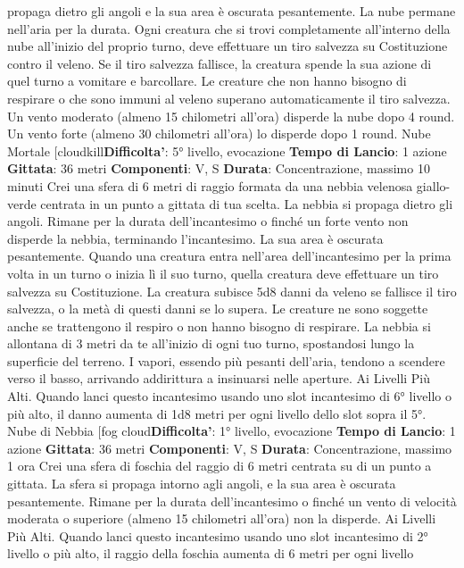 \begin{multicols}{2}
propaga dietro gli angoli e la sua area è oscurata
pesantemente. La nube permane nell’aria per la durata.
Ogni creatura che si trovi completamente all’interno
della nube all’inizio del proprio turno, deve effettuare un
tiro salvezza su Costituzione contro il veleno. Se il tiro
salvezza fallisce, la creatura spende la sua azione di
quel turno a vomitare e barcollare. Le creature che non
hanno bisogno di respirare o che sono immuni al veleno
superano automaticamente il tiro salvezza.
Un vento moderato (almeno 15 chilometri all’ora)
disperde la nube dopo 4 round. Un vento forte (almeno
30 chilometri all’ora) lo disperde dopo 1 round.
Nube Mortale
[cloudkill\textbf{Difficolta'}:
5° livello, evocazione
\textbf{Tempo di Lancio}: 1 azione
\textbf{Gittata}: 36 metri
\textbf{Componenti}: V, S
\textbf{Durata}: Concentrazione, massimo 10 minuti
Crei una sfera di 6 metri di raggio formata da una
nebbia velenosa giallo-verde centrata in un punto a
gittata di tua scelta. La nebbia si propaga dietro gli
angoli. Rimane per la durata dell’incantesimo o finché
un forte vento non disperde la nebbia, terminando
l’incantesimo. La sua area è oscurata pesantemente.
Quando una creatura entra nell’area dell’incantesimo
per la prima volta in un turno o inizia lì il suo turno,
quella creatura deve effettuare un tiro salvezza su
Costituzione. La creatura subisce 5d8 danni da veleno
se fallisce il tiro salvezza, o la metà di questi danni se lo
supera. Le creature ne sono soggette anche se
trattengono il respiro o non hanno bisogno di respirare.
La nebbia si allontana di 3 metri da te all’inizio di ogni
tuo turno, spostandosi lungo la superficie del terreno. I
vapori, essendo più pesanti dell’aria, tendono a
scendere verso il basso, arrivando addirittura a
insinuarsi nelle aperture.
Ai Livelli Più Alti. Quando lanci questo incantesimo
usando uno slot incantesimo di 6° livello o più alto, il
danno aumenta di 1d8 metri per ogni livello dello slot
sopra il 5°.
Nube di Nebbia
[fog cloud\textbf{Difficolta'}:
1° livello, evocazione
\textbf{Tempo di Lancio}: 1 azione
\textbf{Gittata}: 36 metri
\textbf{Componenti}: V, S
\textbf{Durata}: Concentrazione, massimo 1 ora
Crei una sfera di foschia del raggio di 6 metri centrata
su di un punto a gittata. La sfera si propaga intorno agli
angoli, e la sua area è oscurata pesantemente. Rimane
per la durata dell’incantesimo o finché un vento di
velocità moderata o superiore (almeno 15 chilometri
all’ora) non la disperde.
Ai Livelli Più Alti. Quando lanci questo incantesimo
usando uno slot incantesimo di 2° livello o più alto, il
raggio della foschia aumenta di 6 metri per ogni livello

\end{multicols}
